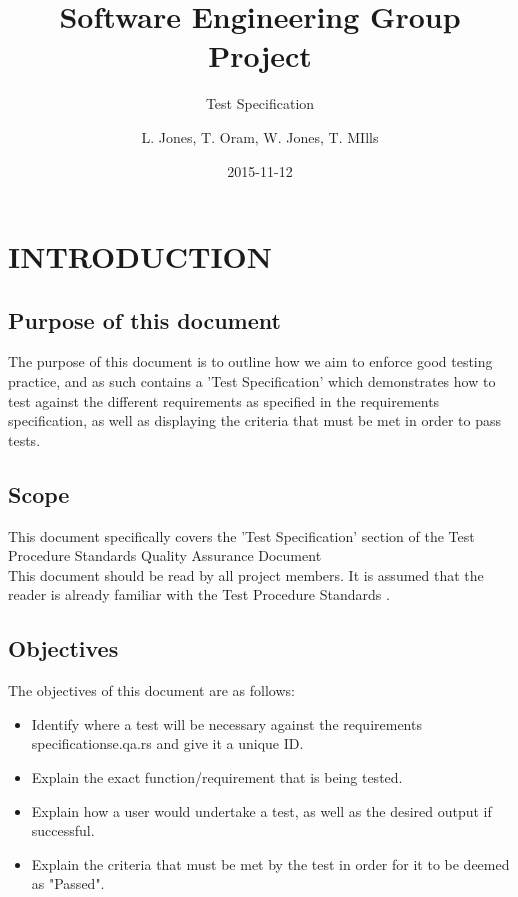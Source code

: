 \documentclass{project}
\begin{document}
\title{Software Engineering Group Project}
\subtitle{Test Specification}
\author{L. Jones, T. Oram, W. Jones, T. MIlls}     
\date{2015-11-12}
\maketitle
\tableofcontents
\newpage
\section{INTRODUCTION}
\subsection{Purpose of this document}
The purpose of this document is to outline how we aim to enforce good testing practice, and as such contains a 'Test Specification' which demonstrates how to test against the different requirements as specified in the requirements specification\cite{se.qa.rs}, as well as displaying the criteria that must be met in order to pass tests.
\subsection{Scope}
This document specifically covers the 'Test Specification' section of the Test Procedure Standards Quality Assurance Document\cite{se.qa.tps}\\
\newline
This document should be read by all project members. It is assumed that the reader is already familiar with the Test Procedure Standards \cite{se.qa.tps}.
\subsection{Objectives}
The objectives of this document are as follows:
\begin{itemize}
	\item Identify where a test will be necessary against the requirements specification{se.qa.rs} and give it a unique ID. 
	\item Explain the exact function/requirement that is being tested.
	\item Explain how a user would undertake a test, as well as the desired output if successful.
	\item Explain the criteria that must be met by the test in order for it to be deemed as "Passed".
\end{itemize} 
\clearpage
\end{document}
